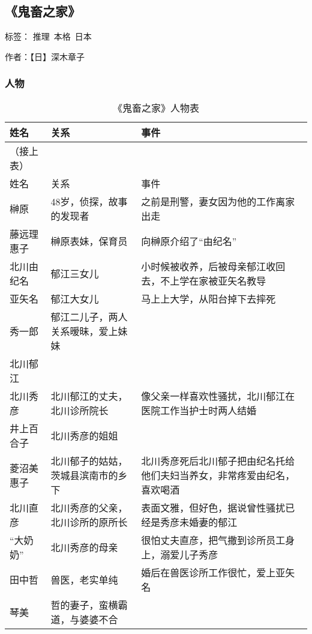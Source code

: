 \subsection{《鬼畜之家》}

标签： 推理\  本格\  日本

作者：【日】深木章子

\subsubsection{人物}
\begin{longtable}{p{} | p{} | p{}}

    \caption{《鬼畜之家》人物表} \\
    \hline
姓名 & 关系 & 事件 \\
\hline
\endfirsthead

（接上表） \\
姓名 & 关系 & 事件 \\
\hline
\endhead

\hline
\endfoot

榊原 & 48岁，侦探，故事的发现者 & 之前是刑警，妻女因为他的工作离家出走 \\
藤远理惠子 & 榊原表妹，保育员 & 向榊原介绍了“由纪名” \\
北川由纪名 & 郁江三女儿 & 小时候被收养，后被母亲郁江收回去，不上学在家被亚矢名教导 \\
亚矢名 & 郁江大女儿 & 马上上大学，从阳台掉下去摔死 \\
秀一郎 & 郁江二儿子，两人关系暧昧，爱上妹妹 &  \\
北川郁江 & & \\
北川秀彦 & 北川郁江的丈夫，北川诊所院长 & 像父亲一样喜欢性骚扰，北川郁江在医院工作当护士时两人结婚 \\
井上百合子 & 北川秀彦的姐姐 & \\
菱沼美惠子 & 北川郁子的姑姑，茨城县滨南市的乡下 & 北川秀彦死后北川郁子把由纪名托给他们夫妇当养女，非常疼爱由纪名，喜欢喝酒 \\
北川直彦 & 北川秀彦的父亲，北川诊所的原所长 & 表面文雅，但好色，据说曾性骚扰已经是秀彦未婚妻的郁江 \\
“大奶奶” & 北川秀彦的母亲 & 很怕丈夫直彦，把气撒到诊所员工身上，溺爱儿子秀彦 \\
田中哲 & 兽医，老实单纯 & 婚后在兽医诊所工作很忙，爱上亚矢名 \\
琴美 & 哲的妻子，蛮横霸道，与婆婆不合 &  \\

\end{longtable}

